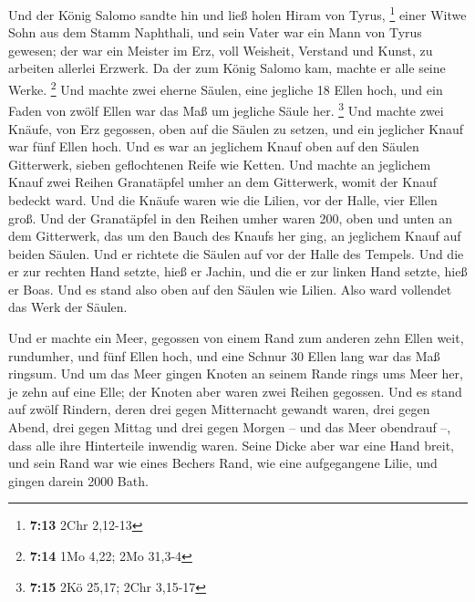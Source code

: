  Und der König Salomo sandte hin und ließ holen Hiram von
Tyrus, \footnote{\textbf{7:13} 2Chr 2,12-13}  einer Witwe
Sohn aus dem Stamm Naphthali, und sein Vater war ein Mann von Tyrus
gewesen; der war ein Meister im Erz, voll Weisheit, Verstand und Kunst,
zu arbeiten allerlei Erzwerk. Da der zum König Salomo kam, machte er
alle seine Werke. \footnote{\textbf{7:14} 1Mo 4,22; 2Mo 31,3-4}
 Und machte zwei eherne Säulen, eine jegliche 18 Ellen
hoch, und ein Faden von zwölf Ellen war das Maß um jegliche Säule her.
\footnote{\textbf{7:15} 2Kö 25,17; 2Chr 3,15-17}  Und
machte zwei Knäufe, von Erz gegossen, oben auf die Säulen zu setzen, und
ein jeglicher Knauf war fünf Ellen hoch.  Und es war an
jeglichem Knauf oben auf den Säulen Gitterwerk, sieben geflochtenen
Reife wie Ketten.  Und machte an jeglichem Knauf zwei
Reihen Granatäpfel umher an dem Gitterwerk, womit der Knauf bedeckt
ward.  Und die Knäufe waren wie die Lilien, vor der Halle,
vier Ellen groß.  Und der Granatäpfel in den Reihen umher
waren 200, oben und unten an dem Gitterwerk, das um den Bauch des Knaufs
her ging, an jeglichem Knauf auf beiden Säulen.  Und er
richtete die Säulen auf vor der Halle des Tempels. Und die er zur
rechten Hand setzte, hieß er Jachin, und die er zur linken Hand setzte,
hieß er Boas.  Und es stand also oben auf den Säulen wie
Lilien. Also ward vollendet das Werk der Säulen.

 Und er machte ein Meer, gegossen von einem Rand zum
anderen zehn Ellen weit, rundumher, und fünf Ellen hoch, und eine Schnur
30 Ellen lang war das Maß ringsum.  Und um das Meer gingen
Knoten an seinem Rande rings ums Meer her, je zehn auf eine Elle; der
Knoten aber waren zwei Reihen gegossen.  Und es stand auf
zwölf Rindern, deren drei gegen Mitternacht gewandt waren, drei gegen
Abend, drei gegen Mittag und drei gegen Morgen -- und das Meer obendrauf
--, dass alle ihre Hinterteile inwendig waren.  Seine Dicke
aber war eine Hand breit, und sein Rand war wie eines Bechers Rand, wie
eine aufgegangene Lilie, und gingen darein 2000 Bath.

